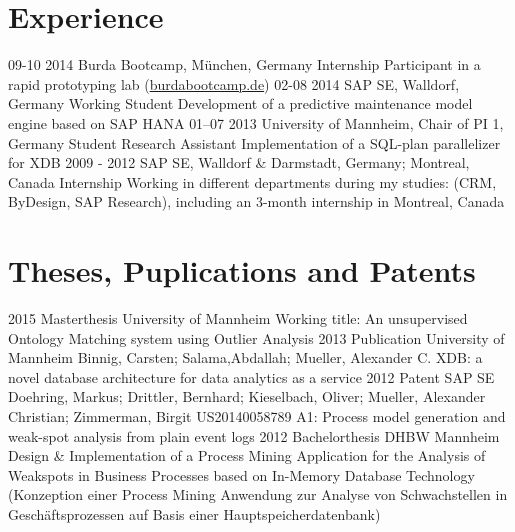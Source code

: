 \documentclass[a4paper]{friggeri-cv}
\begin{document}
\section{Experience}

\begin{entrylist}
  \entry
    {09-10 2014}
    {Burda Bootcamp, München, Germany}
    {Internship}
    {Participant in a rapid prototyping lab (\href{http://burdabootcamp.de}{burdabootcamp.de})}
  \entry
    {02-08 2014}
    {SAP SE, Walldorf, Germany}
    {Working Student}
    {Development of a predictive maintenance model engine based on SAP HANA}
  \entry
    {01–07 2013}
    {University of Mannheim, Chair of PI 1, Germany}
    {Student Research Assistant}
    {Implementation of a SQL-plan parallelizer for XDB}
  \entry
    {2009 - 2012}
    {SAP SE, Walldorf \&  Darmstadt, Germany; Montreal, Canada}
    {Internship}
    {Working in different departments during my studies: (CRM, ByDesign, SAP Research), including an 3-month internship in Montreal, Canada}
\end{entrylist}


\section{Theses, Puplications and Patents}
\begin{entrylist}
	\entry
	 {2015}
    {Masterthesis}
    {University of Mannheim}
    {Working title: An unsupervised Ontology Matching system using Outlier Analysis 	}
	\eduentry
	 {2013}
    {Publication}
    {University of Mannheim}
    {Binnig, Carsten; Salama,Abdallah; Mueller, Alexander C.}
    {XDB: a novel database architecture for data analytics as a service}
	\eduentry
	 {2012}
    {Patent}
    {SAP SE}
    {Doehring, Markus; Drittler, Bernhard; Kieselbach, Oliver; Mueller, Alexander Christian; Zimmerman, Birgit}
	{US20140058789 A1: Process model generation and weak-spot analysis from plain event logs}
	\entry
	 {2012}
    {Bachelorthesis}
    {DHBW Mannheim}
    {Design \& Implementation of a Process Mining Application for the Analysis of Weakspots in Business Processes based on In-Memory Database Technology (Konzeption einer Process Mining Anwendung zur Analyse von Schwachstellen in Geschäftsprozessen auf Basis einer Hauptspeicherdatenbank)}
\end{entrylist}



\end{document}

